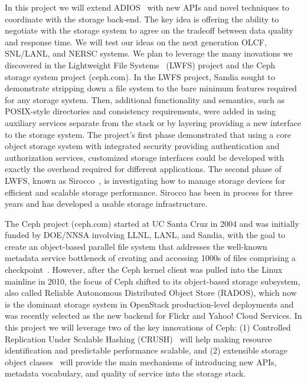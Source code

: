 In this project we will extend ADIOS~\cite{adios} with new APIs and novel techniques
to coordinate with the storage back-end. The key idea is offering the ability to
negotiate with the storage system to agree on the tradeoff between data quality
and response time. We will test our ideas on the next generation OLCF,
SNL/LANL, and NERSC systems.
%
We plan to leverage the many inovations we discovered in 
the Lightweight File Systems~\cite{lwfs} (LWFS) project and the Ceph storage system project (ceph.com).
In the LWFS project, Sandia sought to
demonstrate stripping down a file system to the bare minimum features required
for any storage system. Then, additional functionality and semantics, such as
POSIX-style directories and consistency requirements, were added in using
auxiliary services separate from the stack or by layering providing a new
interface to the storage system. The project's first phase demonstrated that
using a core object storage system with integrated security providing
authentication and authorization services, customized storage interfaces could
be developed with exactly the overhead required for different applications. The
second phase of LWFS, known as Sirocco~\cite{sirocco}, is investigating how to
manage storage devices for efficient and scalable storage performance.  Sirocco
has been in process for three years and has developed a usable storage infrastructure.

The Ceph project (ceph.com) started at UC Santa Cruz in 2004 and
was initially funded by DOE/NNSA involving LLNL, LANL, and Sandia,
with the goal to create an object-based parallel file system that
addresses the well-known metadata service bottleneck of creating
and accessing 1000s of files comprising a checkpoint~\cite{weil:osdi06}.
However, after the Ceph kernel client was pulled into the Linux
mainline in 2010, the focus of Ceph shifted to its object-based
storage subsystem, also called Reliable Autonomous Distributed
Object Store (RADOS), which now is the dominant storage system in
OpenStack production-level deployments and was recently selected
as the new backend for Flickr and Yahoo! Cloud Services. In this
project we will leverage two of the key innovations of Ceph: (1)
Controlled Replication Under Scalable Hashing (CRUSH)~\cite{weil:sc06}
will help making resource identification and predictable performance
scalable, and (2) extensible storage object classes~\cite{watkins:ucsctr15}
will provide the main mechanisms of introducing new APIs,
metadata vocabulary, and quality of service into the storage stack.
